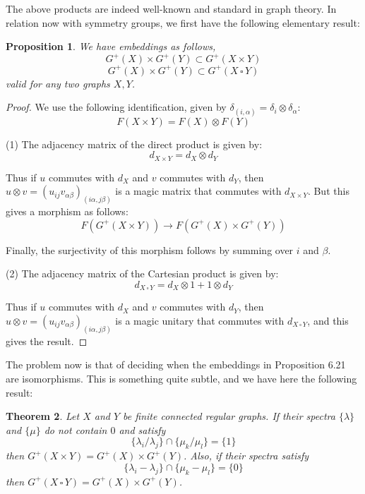 \documentclass[12pt]{amsbook}
\newtheorem{theorem}{Theorem}[chapter]
\newtheorem{proposition}[theorem]{Proposition}
\begin{document}
The above products are indeed well-known and standard in graph theory. In relation now with symmetry groups, we first have the following elementary result:

\begin{proposition}
We have embeddings as follows,
$$G^+(X)\times G^+(Y)\subset G^+(X \times Y)$$
$$G^+(X)\times G^+(Y)\subset G^+(X\,\square\,Y)$$
valid for any two graphs $X,Y$.
\end{proposition}

\begin{proof}
We use the following identification, given by $\delta_{(i,\alpha)}=\delta_i\otimes\delta_\alpha$:
$$F(X\times Y)=F(X)\otimes F(Y)$$

(1) The adjacency matrix of the direct product is given by:
$$d_{X\times Y}=d_X\otimes d_Y$$

Thus if $u$ commutes with $d_X$ and $v$ commutes with $d_Y$, then $u\otimes v=(u_{ij}v_{\alpha\beta})_{(i\alpha,j\beta)}$ is a magic matrix that commutes with $d_{X\times Y}$. But this gives a morphism as follows:
$$F(G^+(X\times Y))\to F(G^+(X)\times G^+(Y))$$ 

Finally, the surjectivity of this morphism follows by summing over $i$ and $\beta$.

\medskip

(2) The adjacency matrix of the Cartesian product is given by:
$$d_{X\,\square\,Y}=d_X\otimes1+1\otimes d_Y$$

Thus if $u$ commutes with $d_X$ and $v$ commutes with $d_Y$, then $u\otimes v=(u_{ij}v_{\alpha\beta})_{(i\alpha,j\beta)}$ is a magic unitary that commutes with $d_{X\,\square\,Y}$, and this gives the result.
\end{proof}

The problem now is that of deciding when the embeddings in Proposition 6.21 are isomorphisms. This is something quite subtle, and we have here the following result: 


\begin{theorem}
Let $X$ and $Y$ be finite connected regular graphs. If their spectra $\{\lambda\}$ and $\{\mu\}$ do not contain $0$ and satisfy
$$\big\{\lambda_i/\lambda_j\big\}\cap\big\{\mu_k/\mu_l\big\}=\{1\}$$
then $G^+(X\times Y)=G^+(X)\times G^+(Y)$. Also, if their spectra satisfy
$$\big\{\lambda_i-\lambda_j\big\}\cap\big\{\mu_k-\mu_l\big\}=\{0\}$$
then $G^+(X\,\square\,Y)=G^+(X)\times G^+(Y)$.
\end{theorem}
\end{document}
